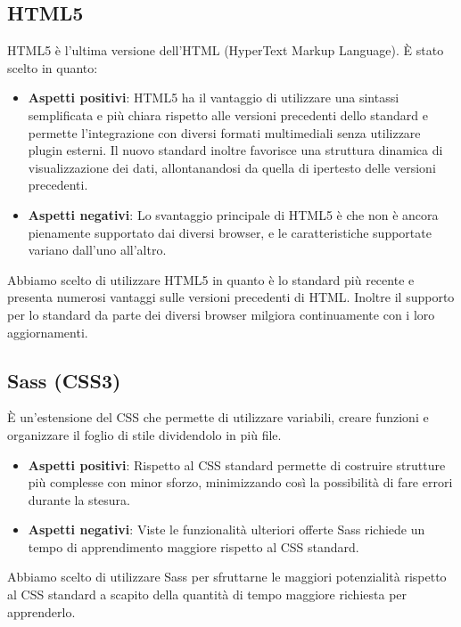 \subsection{HTML5}
HTML5 è l'ultima versione dell'HTML (HyperText Markup Language). È stato scelto in quanto:
\begin{itemize}
	\item \textbf{Aspetti positivi}: HTML5 ha il vantaggio di utilizzare una sintassi semplificata e più chiara rispetto alle versioni precedenti dello standard e permette l'integrazione con diversi formati multimediali senza utilizzare plugin esterni. Il nuovo standard inoltre favorisce una struttura dinamica di visualizzazione dei dati, allontanandosi da quella di ipertesto delle versioni precedenti.
	\item \textbf{Aspetti negativi}: Lo svantaggio principale di HTML5 è che non è ancora pienamente supportato dai diversi browser, e le caratteristiche supportate variano dall'uno all'altro.
\end{itemize}
Abbiamo scelto di utilizzare HTML5 in quanto è lo standard più recente e presenta numerosi vantaggi sulle versioni precedenti di HTML. Inoltre il supporto per lo standard da parte dei diversi browser milgiora continuamente con i loro aggiornamenti.

\subsection{Sass (CSS3)}
È un'estensione del CSS che permette di utilizzare variabili, creare funzioni e organizzare il foglio di stile dividendolo in più file.
\begin{itemize}
	\item \textbf{Aspetti positivi}: Rispetto al CSS standard permette di costruire strutture più complesse con minor sforzo, minimizzando così la possibilità di fare errori durante la stesura.
	\item \textbf{Aspetti negativi}: Viste le funzionalità ulteriori offerte Sass richiede un tempo di apprendimento maggiore rispetto al CSS standard.
\end{itemize} 
Abbiamo scelto di utilizzare Sass per sfruttarne le maggiori potenzialità rispetto al CSS standard a scapito della quantità di tempo maggiore richiesta per apprenderlo. 

